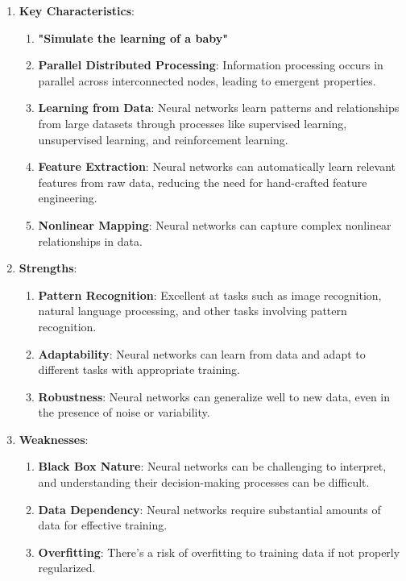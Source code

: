 \begin{enumerate}
\begin{figure}[h!t]
    \label{fig:enter-label}
\end{figure}
\begin{enumerate}
    \item \textbf{Key Characteristics}:
    \begin{enumerate}
        \item \textbf{"Simulate the learning of a baby"}
        \item \textbf{Parallel Distributed Processing}: Information processing occurs in parallel across interconnected nodes, leading to emergent properties.
        \item \textbf{Learning from Data}: Neural networks learn patterns and relationships from large datasets through processes like supervised learning, unsupervised learning, and reinforcement learning.
        \item \textbf{Feature Extraction}: Neural networks can automatically learn relevant features from raw data, reducing the need for hand-crafted feature engineering.
        \item \textbf{Nonlinear Mapping}: Neural networks can capture complex nonlinear relationships in data.
    \end{enumerate}
    \item \textbf{Strengths}:
        \begin{enumerate}
        \item \textbf{Pattern Recognition}: Excellent at tasks such as image recognition, natural language processing, and other tasks involving pattern recognition.
        \item \textbf{Adaptability}: Neural networks can learn from data and adapt to different tasks with appropriate training.
        \item \textbf{Robustness}: Neural networks can generalize well to new data, even in the presence of noise or variability.
    \end{enumerate}
    \item \textbf{Weaknesses}:
            \begin{enumerate}
        \item \textbf{Black Box Nature}: Neural networks can be challenging to interpret, and understanding their decision-making processes can be difficult.
        \item \textbf{Data Dependency}: Neural networks require substantial amounts of data for effective training.
        \item \textbf{Overfitting}: There's a risk of overfitting to training data if not properly regularized.
    \end{enumerate}
\end{enumerate}
\end{enumerate}
